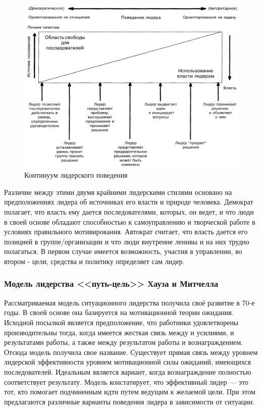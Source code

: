 \documentclass[a4paper,12pt,oneside,final]{extarticle}
\makeatletter
\numberwithin{equation}{section}
\def\maxwidth#1{\ifdim\Gin@nat@width>#1 #1\else\Gin@nat@width\fi}
\makeatother
\begin{document}
\begin{figure}[h]
	\centering
	\includegraphics[width=\maxwidth{\textwidth}]{management-figures/leadership_tsh}
	\caption{Континуум лидерского поведения}
	\label{leadership_tsh}
\end{figure}

Различие между этими двумя крайними лидерскими стилями основано на предположениях лидера об источниках его власти и природе человека. 
Демократ полагает, что власть ему дается последователями, которых, он ведет, и что люди в своей основе обладают способностью к самоуправлению и творческой работе в условиях правильного мотивирования. 
Автократ считает, что власть дается его позицией в группе/организации и что люди внутренне ленивы и на них трудно полагаться. 
В первом случае имеется возможность, участия в управлении, во втором - цели, средства и политику определяет сам лидер.

\subsubsection{Модель лидерства <<путь-цель>> Хауза и Митчелла}
Рассматриваемая модель ситуационного лидерства получила своё развитие в 70-е годы. 
В своей основе она базируется на мотивационной теории ожидания. 
Исходной посылкой является предположение, что работники удовлетворены производительны тогда, когда имеется жесткая связь между и усилиями, и результатами работы, а также между результатом работы и вознаграждением. 
Отсюда модель получила свое название.
Существует прямая связь между уровнем лидерской эффективности уровнем мотивационной силы ожиданий, имеющихся последователей. 
Идеальным является вариант, когда вознаграждение полностью соответствует результату. 
Модель констатирует, что эффективный лидер --- это тот, кто помогает подчиненным идти путем ведущим к желаемой цели. 
При этом предлагаются различные варианты поведения лидера в зависимости от ситуации.
\end{document}
